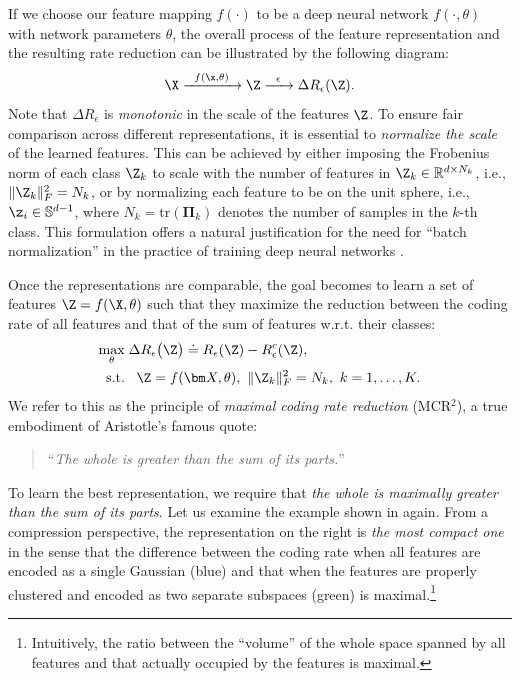 \documentclass[../../book-main.tex]{subfiles}
\begin{document}
If we choose our feature mapping $f(\cdot)$ to be a deep neural network $f(\cdot,\theta)$ with network parameters $\theta$, the overall process of the feature representation and the resulting rate reduction  can be illustrated by the following diagram:
\begin{equation}
	\X
	\xrightarrow{\hspace{2mm} f(\x, \theta)\hspace{2mm}} \Z  \xrightarrow{\hspace{2mm} \epsilon \hspace{2mm}} \Delta R_{\epsilon}(\Z).
	\label{chap4-eqn:flow}
\end{equation}
Note that $\Delta R_{\epsilon}$ is {\em monotonic} in the scale of the features $\Z$. To ensure fair comparison across different representations, it is essential to {\em normalize the scale} of the learned features. This can be achieved by either imposing the Frobenius norm of each class $\Z_k$ to scale with the number of features in $\Z_k \in \mathbb R^{d \times N_k}$, i.e., $\|\Z_k\|_F^2 = N_k$, or by normalizing each feature to be on the unit sphere, i.e., $\z_i \in \mathbb{S}^{d-1}$, where $N_k=\mathrm{tr}(\bm \Pi_k)$ denotes the number of samples in the $k$-th class. This formulation offers a natural justification for the need for ``batch normalization'' in the practice of
training deep neural networks \cite{ioffe2015batch}. %

Once the representations are comparable, the goal becomes to learn a set of features $\Z  = f(\X, \theta)$  such that they maximize the reduction between the coding rate of all features and that of the sum of features w.r.t. their classes:
\begin{equation}
	\begin{aligned}
		\max_{\theta } & \;  \Delta R_{\epsilon}\big(\Z \big) \doteq R_{\epsilon}(\Z) - R_{\epsilon}^c(\Z ), \\
		\mbox{s.t.} & \ \ \, \Z = f(\bm X, \theta),\  \|\Z_k\|_F^2                                          = N_k,\ k=1,\dots,K. 
	\end{aligned}
	\label{eqn:maximal-rate-reduction}
\end{equation}
We refer to this as the principle of {\em maximal coding rate reduction} (MCR$^2$),
a true embodiment of Aristotle's famous quote:
\begin{quote}
	\centering
	``{\em The whole is greater than the sum of its parts.}''
\end{quote}
To learn the best representation, we require that {\em the whole is maximally greater than the sum of its parts}. Let us examine the example shown in  again. From a compression perspective, the representation on the right is {\em the most compact one} in the sense that the difference between the coding rate when all features are encoded as a single Gaussian (blue) and that when the features are properly clustered and encoded as two separate subspaces (green) is maximal.\footnote{Intuitively, the ratio between the ``volume'' of the whole space spanned by all features and that actually occupied by the features is maximal.}
\end{document}
